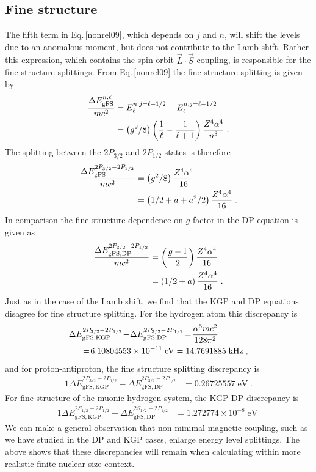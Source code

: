 \documentclass[epj]{svjour}
\begin{document}
\subsection{Fine structure} \label{fs}
The fifth term in Eq.\,\eqref{nonrel09}, which depends on $j$ and $n$, will shift the levels due to an anomalous moment, but does not contribute to the Lamb shift. Rather this expression, which contains the spin-orbit $\vec{L}\cdot\vec{S}$ coupling, is responsible for the fine structure splittings. From Eq.\,\eqref{nonrel09} the fine structure splitting is given by
\begin{alignat}{1}
\label{fs00} \frac{\Delta E_{\mathrm{gFS}}^{n,\ell}}{mc^{2}}&=E^{n,j=\ell+1/2}_{\ell}-E^{n,j=\ell-1/2}_{\ell}\\ \notag &=\left(g^{2}/8\right)\left(\frac{1}{\ell}-\frac{1}{\ell+1}\right)\frac{Z^{4}\alpha^{4}}{n^{3}}\;.
\end{alignat}
The splitting between the $2P_{3/2}$ and $2P_{1/2}$ states is therefore
\begin{alignat}{1}
\label{fs01} \frac{\Delta E_{\mathrm{gFS}}^{2P_{3/2}-2P_{1/2}}}{mc^{2}}&=\left(g^{2}/8\right)\frac{Z^{4}\alpha^{4}}{16}\\ \notag\ &=\left(1/2+a+a^{2}/2\right)\frac{Z^{4}\alpha^{4}}{16}\;.
\end{alignat}
In comparison the fine structure dependence on $g$-factor in the DP equation is given as
\begin{alignat}{1}
\label{fs02} \frac{\Delta E_{\mathrm{gFS,DP}}^{2P_{3/2}-2P_{1/2}}}{mc^{2}}&=\left(\frac{g-1}{2}\right)\frac{Z^{4}\alpha^{4}}{16}\\ \notag\ &=\left(1/2+a\right)\frac{Z^{4}\alpha^{4}}{16}\;.
\end{alignat}
Just as in the case of the Lamb shift, we find that the KGP and DP equations disagree for fine structure splitting. For the hydrogen atom this discrepancy is 
\begin{alignat}{1}
\label{fs03} \Delta &E_{\mathrm{gFS,KGP}}^{2P_{3/2}-2P_{1/2}}\!-\!\Delta E_{\mathrm{gFS,DP}}^{2P_{3/2}-2P_{1/2}}\!=\!\frac{\alpha^{6}mc^{2}}{128\pi^{2}}\\ \notag&\;\;=\!6.10804553\times10^{-11}\;\mathrm{eV}=14.7691885\;\mathrm{kHz}\;,\end{alignat}
and for proton-antiproton, the fine structure splitting discrepancy is
\begin{alignat}{1}
\label{fs04} \Delta E_{\mathrm{gFS,KGP}}^{2P_{3/2}-2P_{1/2}}-\Delta E_{\mathrm{gFS,DP}}^{2P_{3/2}-2P_{1/2}}&=0.26725557\;\mathrm{eV}\;.
\end{alignat}
For fine structure of the muonic-hydrogen system, the KGP-DP discrepancy is
\begin{alignat}{1}
\label{fs05} \Delta E_{\mathrm{gFS,KGP}}^{2S_{1/2}-2P_{1/2}}-\Delta E_{\mathrm{gFS,DP}}^{2S_{1/2}-2P_{1/2}}&=\!1.272774\times10^{-8}\;\mathrm{eV}\;
\end{alignat} 
We can make a general observation that non minimal magnetic coupling, such as we have studied in the DP and KGP cases, enlarge energy level splittings. The above shows that these discrepancies will remain when calculating within more realistic finite nuclear size context.
\end{document}
